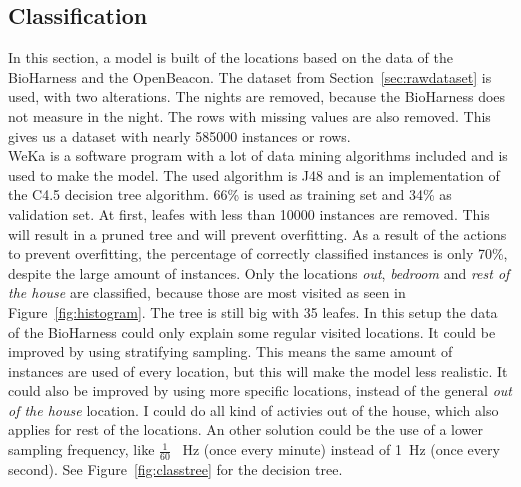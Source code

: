 	\subsection{Classification}
	\label{sec:classification}
	In this section, a model is built of the locations based on the data of the BioHarness and the OpenBeacon. The dataset from Section~\ref{sec:rawdataset}  is used, with two alterations. The nights are removed, because the BioHarness does not measure in the night. The rows with missing values are also removed. This gives us a dataset with nearly 585000 instances or rows.
	\\
	WeKa \cite{weka} is a software program with a lot of data mining algorithms included and is used to make the model. The used algorithm is J48 and is an implementation of the C4.5 \cite{quinlan1993c4} decision tree algorithm. 66\% is used as training set and 34\% as validation set. At first, leafes with less than 10000 instances are removed. This will result in a pruned tree and will prevent overfitting. As a result of the actions to prevent overfitting, the percentage of correctly classified instances is only 70\%, despite the large amount of instances. Only the locations \emph{out}, \emph{bedroom} and \emph{rest of the house} are classified, because those are most visited as seen in Figure~\ref{fig:histogram}. The tree is still big with 35 leafes. In this setup the data of the BioHarness could only explain some regular visited locations. It could be improved by using stratifying sampling. This means the same amount of instances are used of every location, but this will make the model less realistic. It could also be improved by using more specific locations, instead of the general \emph{out of the house} location. I could do all kind of activies out of the house, which also applies for rest of the locations. An other solution could be the use of a lower sampling frequency, like $\frac{1}{60}$ \SI{}{\hertz} (once every minute) instead of \SI{1}{\hertz} (once every second). See Figure~\ref{fig:classtree} for the decision tree. \\
